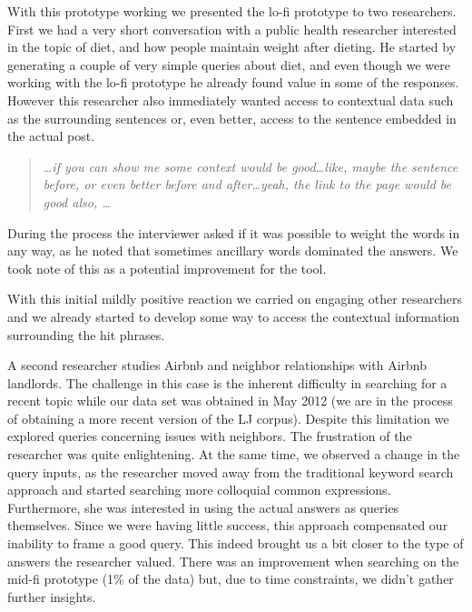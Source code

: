 \documentclass{sigchi}
\begin{document}
With this prototype working we presented the lo-fi prototype to two researchers. First we had a very short conversation with a public health researcher interested in the topic of diet, and how people maintain weight after dieting. He started by generating a couple of very simple queries about diet, and even though we were working with the lo-fi prototype he already found value in some of the responses. However this researcher also immediately wanted access to contextual data such as the surrounding sentences or, even better, access to the sentence embedded in the actual post. 

\begin{quote}
{\em
\dots if you can show me some context would be good\dots like, maybe the sentence before, or even better before and after\dots yeah, the link to the page would be good also, \dots
}\end{quote}


During the process the interviewer asked if it was possible to weight the words in any way, as he noted that sometimes ancillary words dominated the answers. We took note of this as a potential improvement for the tool.

With this initial mildly positive reaction we carried on engaging other researchers and we already started to develop some way to access the contextual information surrounding the hit phrases. 


A second researcher studies Airbnb and neighbor relationships with Airbnb landlords. The challenge in this case is the inherent difficulty in searching for a recent topic while our data set was obtained in May 2012 (we are in the process of obtaining a more recent version of the LJ corpus). Despite this limitation we explored queries concerning issues with neighbors. The frustration of the researcher was quite enlightening. At the same time, we observed a change in the query inputs, as the researcher moved away from the traditional keyword search approach and started searching more colloquial common expressions. Furthermore, she was interested in using the actual answers as queries themselves. Since we were having little success, this approach compensated our inability to frame a good query. This indeed brought us a bit closer to the type of answers the researcher valued. There was an improvement when searching on the mid-fi prototype (1\% of the data) but, due to time constraints, we didn't gather further insights.
\end{document}
